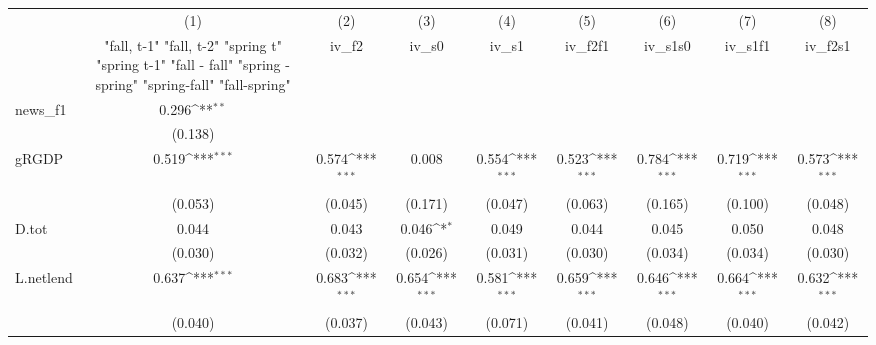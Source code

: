 {
\def\sym#1{\ifmmode^{#1}\else\(^{#1}\)\fi}
\begin{tabular}{l*{8}{c}}
\toprule
            &\multicolumn{1}{c}{(1)}&\multicolumn{1}{c}{(2)}&\multicolumn{1}{c}{(3)}&\multicolumn{1}{c}{(4)}&\multicolumn{1}{c}{(5)}&\multicolumn{1}{c}{(6)}&\multicolumn{1}{c}{(7)}&\multicolumn{1}{c}{(8)}\\
            &\multicolumn{1}{c}{  "fall, t-1" "fall, t-2" "spring t" "spring t-1"  "fall - fall" "spring - spring" "spring-fall" "fall-spring" }&\multicolumn{1}{c}{iv\_f2}&\multicolumn{1}{c}{iv\_s0}&\multicolumn{1}{c}{iv\_s1}&\multicolumn{1}{c}{iv\_f2f1}&\multicolumn{1}{c}{iv\_s1s0}&\multicolumn{1}{c}{iv\_s1f1}&\multicolumn{1}{c}{iv\_f2s1}\\
\midrule
news\_f1     &       0.296\sym{**} &                     &                     &                     &                     &                     &                     &                     \\
            &     (0.138)         &                     &                     &                     &                     &                     &                     &                     \\
\addlinespace
gRGDP       &       0.519\sym{***}&       0.574\sym{***}&       0.008         &       0.554\sym{***}&       0.523\sym{***}&       0.784\sym{***}&       0.719\sym{***}&       0.573\sym{***}\\
            &     (0.053)         &     (0.045)         &     (0.171)         &     (0.047)         &     (0.063)         &     (0.165)         &     (0.100)         &     (0.048)         \\
\addlinespace
D.tot       &       0.044         &       0.043         &       0.046\sym{*}  &       0.049         &       0.044         &       0.045         &       0.050         &       0.048         \\
            &     (0.030)         &     (0.032)         &     (0.026)         &     (0.031)         &     (0.030)         &     (0.034)         &     (0.034)         &     (0.030)         \\
\addlinespace
L.netlend   &       0.637\sym{***}&       0.683\sym{***}&       0.654\sym{***}&       0.581\sym{***}&       0.659\sym{***}&       0.646\sym{***}&       0.664\sym{***}&       0.632\sym{***}\\
            &     (0.040)         &     (0.037)         &     (0.043)         &     (0.071)         &     (0.041)         &     (0.048)         &     (0.040)         &     (0.042)         \\

\end{tabular}}
